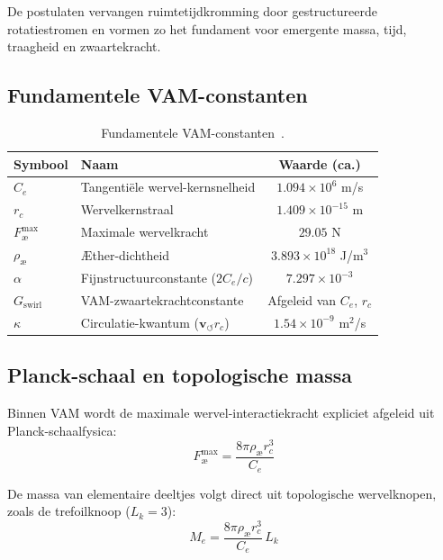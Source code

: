 De postulaten vervangen ruimtetijdkromming door gestructureerde rotatiestromen en vormen zo het fundament voor emergente massa, tijd, traagheid en zwaartekracht.

\subsection*{Fundamentele VAM-constanten}

\begin{table}[htbp]
    \centering
    \begin{tabular}{llc}
        \hline
        \toprule
        \textbf{Symbool} & \textbf{Naam} & \textbf{Waarde (ca.)} \\
        \hline
        \midrule
        $C_e$ & Tangentiële wervel-kernsnelheid & $1.094 \times 10^6$ m/s \\
        $r_c$ & Wervelkernstraal & $1.409 \times 10^{-15}$ m \\
        $F^{\text{max}}_{\text{\ae}}$ & Maximale wervelkracht & $29.05$ N \\
        $\rho_\text{\ae}$ & Æther-dichtheid & $3.893 \times 10^{18}$ J/m$^3$ \\
        $\alpha$ & Fijnstructuurconstante ($2 C_e/c$) & $7.297 \times 10^{-3}$\\
        $G_\text{swirl}$ & VAM-zwaartekrachtconstante & Afgeleid van $C_e$, $r_c$\\
        $\kappa$ & Circulatie-kwantum ($\mathbf{v}_{\scriptscriptstyle\boldsymbol{\circlearrowleft}} r_c$) & $1.54 \times 10^{-9}$ m$^2$/s \\
        \hline
        \bottomrule
    \end{tabular}
    \caption{Fundamentele VAM-constanten~\cite{vam2025field}.}
    \label{tab:VAMconstants}
\end{table}

\subsection*{Planck-schaal en topologische massa}

Binnen VAM wordt de maximale wervel-interactiekracht expliciet afgeleid uit Planck-schaalfysica:
\begin{equation}
    F^{\text{max}}_{\text{\ae}} = \frac{8\pi \rho_\text{\ae} r_c^3}{C_e}
\end{equation}


De massa van elementaire deeltjes volgt direct uit topologische wervelknopen, zoals de trefoilknoop ($L_k=3$):
\begin{equation}
    M_e = \frac{8\pi \rho_\text{\ae} r_c^3}{C_e}\, L_k
\end{equation}



